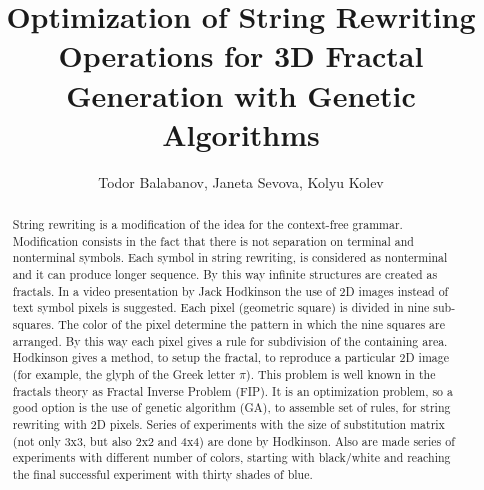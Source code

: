 \documentclass{llncs}
\begin{document}
\title{Optimization of String Rewriting Operations for 3D Fractal Generation with Genetic Algorithms}

\author{Todor Balabanov, Janeta Sevova, Kolyu Kolev}



\maketitle

\begin{abstract}
String rewriting is a modification of the idea for the context-free grammar. Modification consists in the fact that there is not separation on terminal and nonterminal symbols. Each symbol in string rewriting, is considered as nonterminal and it can produce longer sequence. By this way infinite structures are created as fractals. In a video presentation by Jack Hodkinson the use of 2D images instead of text symbol pixels is suggested. Each pixel (geometric square) is divided in nine sub-squares. The color of the pixel determine the pattern in which the nine squares are arranged. By this way each pixel gives a rule for subdivision of the containing area. Hodkinson gives a method, to setup the fractal, to reproduce a particular 2D image (for example, the glyph of the Greek letter $\pi$). This problem is well known in the fractals theory as Fractal Inverse Problem (FIP). It is an optimization problem, so a good option is the use of genetic algorithm (GA), to assemble set of rules, for string rewriting with 2D pixels. Series of experiments with the size of substitution matrix (not only 3x3, but also 2x2 and 4x4) are done by Hodkinson. Also are made series of experiments with different number of colors, starting with black/white and reaching the final successful experiment with thirty shades of blue.

\end{abstract}
\end{document}
